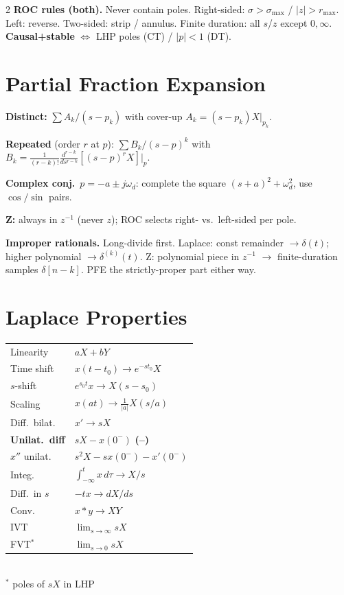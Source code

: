 \documentclass[11pt,landscape]{extarticle}
\begin{document}
\begin{paracol}{2}
\textbf{ROC rules (both).} Never contain poles. Right-sided: $\sigma>\sigma_{\max}$ / $|z|>r_{\max}$. Left: reverse. Two-sided: strip / annulus. Finite duration: all $s$/$z$ except $0,\infty$. \textbf{Causal+stable} $\Leftrightarrow$ LHP poles (CT) / $|p|<1$ (DT).

\section*{Partial Fraction Expansion}
\textbf{Distinct:} $\sum A_k/(s-p_k)$ with cover-up $A_k=(s-p_k)X|_{p_k}$.

\textbf{Repeated} (order $r$ at $p$): $\sum B_k/(s-p)^k$ with $B_k=\tfrac{1}{(r-k)!}\tfrac{d^{r-k}}{ds^{r-k}}[(s-p)^r X]|_p$.

\textbf{Complex conj.}\ $p=-a\pm j\omega_d$: complete the square $(s+a)^2+\omega_d^2$, use $\cos/\sin$ pairs.

\textbf{Z:} always in $z^{-1}$ (never $z$); ROC selects right- vs.\ left-sided per pole.

\textbf{Improper rationals.} Long-divide first. Laplace: const remainder $\to\delta(t)$; higher polynomial $\to\delta^{(k)}(t)$. Z: polynomial piece in $z^{-1}$ $\to$ finite-duration samples $\delta[n{-}k]$. PFE the strictly-proper part either way.

\switchcolumn*

\section*{Laplace Properties}
\begin{tabular}{@{}l l@{}}
\toprule
Linearity & $aX{+}bY$ \\
Time shift & $x(t{-}t_0)\!\to\!e^{-st_0}X$ \\
$s$-shift & $e^{s_0 t}x\!\to\!X(s{-}s_0)$ \\
Scaling & $x(at)\!\to\!\tfrac{1}{|a|}X(s/a)$ \\
Diff.\ bilat. & $x'\!\to\!sX$ \\
\textbf{Unilat.\ diff} & $sX{-}x(0^-)$ \textbf{(--)} \\
$x''$ unilat. & $s^2X{-}sx(0^-){-}x'(0^-)$ \\
Integ. & $\int_{-\infty}^t\!x\,d\tau\!\to\!X/s$ \\
Diff.\ in $s$ & $-tx\!\to\!dX/ds$ \\
Conv. & $x*y\!\to\!XY$ \\
IVT & $\lim_{s\to\infty}\!sX$ \\
FVT$^\ast$ & $\lim_{s\to 0}\!sX$ \\
\bottomrule
\end{tabular}\\[1pt]
{\footnotesize$^\ast$ poles of $sX$ in LHP}


\end{paracol}
\end{document}
